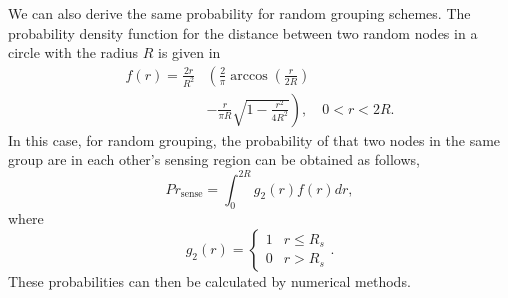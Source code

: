 We can also derive the same probability for random grouping schemes. The probability density function for the distance between two random nodes in a circle with the radius $R$ is given in \cite{moltchanov2012distance}
\begin{equation}
\begin{split}
f(r)=\frac{2r}{R^2} & \left( \frac{2}{\pi}\arccos(\frac{r}{2R}) \right. \\
& \left.  - \frac{r}{\pi R} \sqrt{1- \frac{r^2}{4R^2}} \right ) ,\quad 0<r<2R.
\end{split}
\end{equation}
In this case, for random grouping, the probability of that two nodes in the same group are in each other's sensing region can be obtained as follows,
\begin{equation}
Pr_{\text{sense}}=\int_0^{2R}g_2(r)f(r)dr,
\end{equation}
where
\begin{equation}
g_2(r)=
\begin{cases} 
      1 & r \leq R_s \\
      0 & r > R_s
   \end{cases}.
\end{equation}
These probabilities can then be calculated by numerical methods.